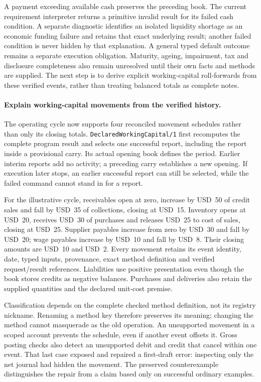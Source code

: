 A payment exceeding available cash preserves the preceding book. The current
requirement interpreter returns a primitive invalid result for its failed cash
condition. A separate diagnostic identifies an isolated liquidity shortage as
an economic funding failure and retains that exact underlying result; another
failed condition is never hidden by that explanation. A general typed default
outcome remains a separate execution obligation. Maturity, ageing, impairment,
tax and disclosure completeness also remain unresolved until their own facts and
methods are supplied. The next step is to derive explicit working-capital
roll-forwards from these verified events, rather than treating balanced totals
as complete notes.


\paragraph{Explain working-capital movements from the verified history.}
The operating cycle now supports four reconciled movement schedules rather than
only its closing totals. \texttt{DeclaredWorkingCapital/1} first recomputes the
complete program result and selects one successful report, including the report
inside a provisional carry. Its actual opening book defines the period. Earlier
interim reports add no activity; a preceding carry establishes a new opening.
If execution later stops, an earlier successful report can still be selected,
while the failed command cannot stand in for a report.

For the illustrative cycle, receivables open at zero, increase by USD~50 of credit
sales and fall by USD~35 of collections, closing at USD~15. Inventory opens at
USD~20, receives USD~30 of purchases and releases USD~25 to cost of sales, closing
at USD~25. Supplier payables increase from zero by USD~30 and fall by USD~20;
wage payables increase by USD~10 and fall by USD~8. Their closing amounts are
USD~10 and USD~2. Every movement retains its event identity, date, typed inputs,
provenance, exact method definition and verified request/result references.
Liabilities use positive presentation even though the book stores credits as
negative balances. Purchases and deliveries also retain the supplied quantities
and the declared unit-cost premise.

Classification depends on the complete checked method definition, not its registry
nickname. Renaming a method key therefore preserves its meaning; changing the
method cannot masquerade as the old operation. An unsupported movement in a scoped
account prevents the schedule, even if another event offsets it. Gross posting
checks also detect an unsupported debit and credit that cancel within one event.
That last case exposed and repaired a first-draft error: inspecting only the net
journal had hidden the movement. The preserved counterexample distinguishes the
repair from a claim based only on successful ordinary examples.

